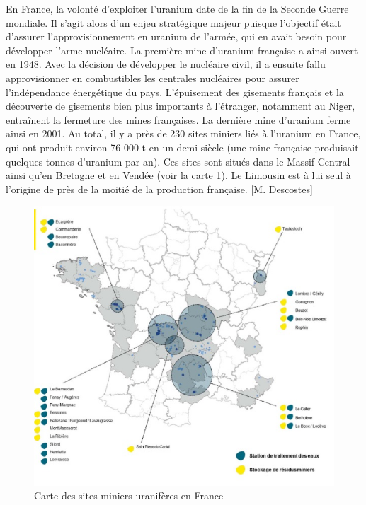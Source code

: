 \documentclass{article}
\begin{document}
En France, la volonté d’exploiter l’uranium date de la fin de la Seconde Guerre mondiale. Il s’agit alors d’un enjeu stratégique majeur puisque l’objectif était d’assurer l’approvisionnement en uranium de l’armée, qui en avait besoin pour développer l’arme nucléaire. La première mine d’uranium française a ainsi ouvert en 1948. Avec la décision de développer le nucléaire civil, il a ensuite fallu approvisionner en combustibles les centrales nucléaires pour assurer l’indépendance énergétique du pays. L’épuisement des gisements français et la découverte de gisements bien plus importants à l’étranger, notamment au Niger, entraînent la fermeture des mines françaises. La dernière mine d’uranium ferme ainsi en 2001. Au total, il y a près de 230 sites miniers liés à l’uranium en France, qui ont produit environ 76 000 t en un demi-siècle (une mine française produisait quelques tonnes d’uranium par an). Ces sites sont situés dans le Massif Central ainsi qu’en Bretagne et en Vendée (voir la carte \ref{fig:sites_orano}). Le Limousin est à lui seul à l’origine de près de la moitié de la production française. [M. Descostes]

\begin{figure}[!h]
    \centering
    \includegraphics[width=\linewidth]{I_A_2.jpg}
    \caption{Carte des sites miniers uranifères en France}
    \label{fig:sites_orano}
\end{figure}
\end{document}
